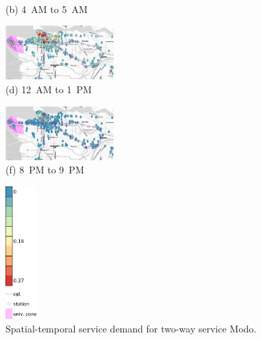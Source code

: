 \begin{figure}[hhh!!]
\begin{minipage}[b]{0.3\linewidth}
\begin{minipage}[b]{\linewidth}
           {\\(b) 4~AM to 5~AM}
         \end{minipage}
         \begin{minipage}[b]{\linewidth}
           \centering
           \hspace*{-0.1cm}
           \includegraphics[width=42mm]{modo_heatmaps/min/12.pdf}
           {\\(d) 12~AM to 1~PM}
         \end{minipage}
         \begin{minipage}[b]{\linewidth}
           \hspace*{-0.1cm}
           \centering
           \includegraphics[width=42mm]{modo_heatmaps/min/20.pdf}
           {\\(f) 8~PM to 9~PM}
         \end{minipage}
   \end{minipage}
   \begin{minipage}[b]{0.1\linewidth}
   \centering
   		 \hspace*{12mm}
   		 \includegraphics[width=12mm]{modo_heatmaps/legenda_modo.pdf}
         \vspace{17mm}
   \end{minipage}
   \caption{Spatial-temporal service demand for two-way service Modo.}
   \label{fig:heat_modo}
\end{figure}

